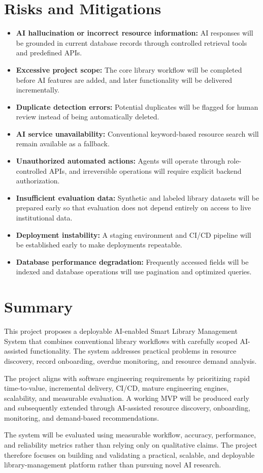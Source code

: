 \documentclass[11pt,a4paper]{article}
\begin{document}
\section{Risks and Mitigations}
\begin{itemize}
    \item \textbf{AI hallucination or incorrect resource information:} AI responses will be grounded in current database records through controlled retrieval tools and predefined APIs.
    \item \textbf{Excessive project scope:} The core library workflow will be completed before AI features are added, and later functionality will be delivered incrementally.
    \item \textbf{Duplicate detection errors:} Potential duplicates will be flagged for human review instead of being automatically deleted.
    \item \textbf{AI service unavailability:} Conventional keyword-based resource search will remain available as a fallback.
    \item \textbf{Unauthorized automated actions:} Agents will operate through role-controlled APIs, and irreversible operations will require explicit backend authorization.
    \item \textbf{Insufficient evaluation data:} Synthetic and labeled library datasets will be prepared early so that evaluation does not depend entirely on access to live institutional data.
    \item \textbf{Deployment instability:} A staging environment and CI/CD pipeline will be established early to make deployments repeatable.
    \item \textbf{Database performance degradation:} Frequently accessed fields will be indexed and database operations will use pagination and optimized queries.
\end{itemize}

\section{Summary}
This project proposes a deployable AI-enabled Smart Library Management System that combines conventional library workflows with carefully scoped AI-assisted functionality. The system addresses practical problems in resource discovery, record onboarding, overdue monitoring, and resource demand analysis.

The project aligns with software engineering requirements by prioritizing rapid time-to-value, incremental delivery, CI/CD, mature engineering engines, scalability, and measurable evaluation. A working MVP will be produced early and subsequently extended through AI-assisted resource discovery, onboarding, monitoring, and demand-based recommendations.

The system will be evaluated using measurable workflow, accuracy, performance, and reliability metrics rather than relying only on qualitative claims. The project therefore focuses on building and validating a practical, scalable, and deployable library-management platform rather than pursuing novel AI research.
\end{document}
